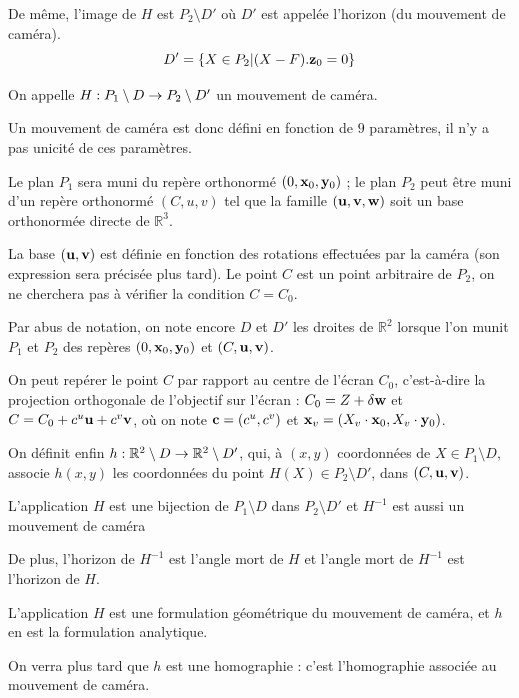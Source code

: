 \begin{defnot}
De même, l'image de $H$ est $P_2 \setminus D'$ où $D'$ est appelée l'horizon (du mouvement de caméra).
\begin{equation*}
D'=\{ X\in P_2 | (X-F).\mathbf{z}_0=0\}
\end{equation*}

On appelle $H:P_1 \setminus D \rightarrow P_2 \setminus D'$ un mouvement de caméra.

Un mouvement de caméra est donc défini en fonction de $9$ paramètres, il n'y a pas unicité de ces paramètres.

Le plan $P_1$ sera muni du repère orthonormé $(0,\mathbf{x}_0,\mathbf{y}_0)$ ; le plan $P_{2}$ peut être muni d'un repère orthonormé $(C,u,v)$ tel que la famille $(\mathbf{u},\mathbf{v},\mathbf{w})$ soit un base orthonormée directe de $\mathbb{R}^{3}$.

La base $(\mathbf{u},\mathbf{v})$ est définie en fonction des rotations effectuées par la caméra (son expression sera précisée plus tard). Le point $C$ est un point arbitraire de $P_2$, on ne cherchera pas à vérifier la condition $C=C_0$.

Par abus de notation, on note encore $D$ et $D'$ les droites de $\mathbb{R}^{2}$ lorsque l'on munit $P_1$ et $P_2$ des repères $(0,\mathbf{x}_0,\mathbf{y}_0)$ et $(C,\mathbf{u},\mathbf{v})$.

On peut repérer le point $C$ par rapport au centre de l'écran $C_{0}$, c'est-à-dire la projection orthogonale de l'objectif sur l'écran : $C_{0}=Z+\delta \mathbf{w}$ et $C=C_{0}+c^{u}\mathbf{u}+c^{v}\mathbf{v}$, où on note $\mathbf{c}=(c^u,c^v)$ et $\mathbf{x}_v = (X_v \cdot \mathbf{x}_0,X_v \cdot \mathbf{y}_0)$.

On définit enfin $h:\mathbb{R}^{2} \setminus D \rightarrow \mathbb{R}^{2}\setminus D'$, qui, à $(x,y)$ coordonnées de $X\in P_1\setminus D$, associe $h(x,y)$ les coordonnées du point $H(X)\in P_2 \setminus D'$, dans $(C,\mathbf{u},\mathbf{v})$.
\label{defpoint}
\end{defnot}

\begin{remarque}
L'application $H$ est une bijection de $P_1 \setminus D$ dans $P_2 \setminus D'$ et $H^{-1}$ est aussi un mouvement de caméra

De plus, l'horizon de $H^{-1}$ est l'angle mort de $H$ et l'angle mort de $H^{-1}$ est l'horizon de $H$.
\end{remarque}

\begin{remarque}
L'application $H$ est une formulation géométrique du mouvement de caméra, et $h$ en est la formulation analytique.

On verra plus tard que $h$ est une homographie : c'est l'homographie associée au mouvement de caméra.
\end{remarque}


